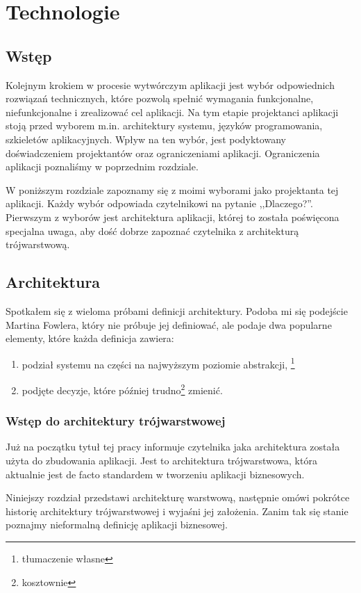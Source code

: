 \documentclass[a4paper,onecolumn,oneside,11pt,wide,floatssmall]{mwrep}
\theoremstyle{definition}
\theoremstyle{plain}%
\theoremstyle{remark}
\begin{document}
\chapter{Technologie}

\section{Wstęp}
Kolejnym krokiem w procesie wytwórczym aplikacji jest wybór odpowiednich rozwiązań technicznych, które pozwolą spełnić wymagania funkcjonalne, niefunkcjonalne i zrealizować cel aplikacji. Na tym etapie projektanci aplikacji stoją przed wyborem m.in. architektury systemu, języków programowania, szkieletów aplikacyjnych. Wpływ na ten wybór, jest podyktowany doświadczeniem projektantów oraz ograniczeniami aplikacji. Ograniczenia aplikacji poznaliśmy w poprzednim rozdziale.

W poniższym rozdziale zapoznamy się z moimi wyborami jako projektanta tej aplikacji. Każdy wybór odpowiada czytelnikowi na pytanie ,,Dlaczego?''. Pierwszym z wyborów jest architektura aplikacji, której to została poświęcona specjalna uwaga, aby dość dobrze zapoznać czytelnika z architekturą trójwarstwową.

\section{Architektura}
Spotkałem się z wieloma próbami definicji architektury. Podoba mi się podejście Martina Fowlera, który nie próbuje jej 
definiować, ale podaje dwa popularne elementy, które każda definicja zawiera: \cite{fowler2003patterns}

\begin{enumerate}
  \item podział systemu na części na najwyższym poziomie abstrakcji, \footnote{tłumaczenie własne}
  \item podjęte decyzje, które później trudno\footnote{kosztownie} zmienić.
\end{enumerate}
\subsection{Wstęp do architektury trójwarstwowej}
Już na początku tytuł tej pracy informuje czytelnika jaka architektura została użyta do zbudowania aplikacji. Jest to 
architektura trójwarstwowa, która aktualnie jest de facto standardem w tworzeniu aplikacji biznesowych. 

Niniejszy rozdział przedstawi architekturę warstwową, następnie omówi pokrótce historię architektury trójwarstwowej i 
wyjaśni jej założenia. Zanim tak się stanie poznajmy nieformalną definicję aplikacji biznesowej. 
\end{document}

